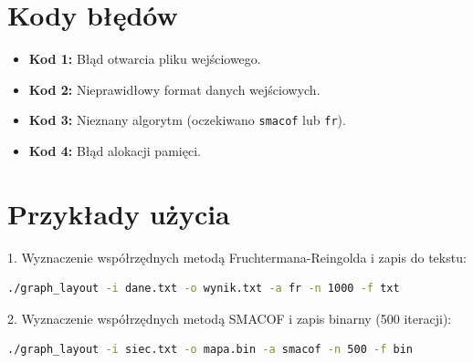 \documentclass[12pt,a4paper]{article}
\begin{document}
\section{Kody błędów}
\begin{itemize}
    \item \textbf{Kod 1:} Błąd otwarcia pliku wejściowego.
    \item \textbf{Kod 2:} Nieprawidłowy format danych wejściowych.
    \item \textbf{Kod 3:} Nieznany algorytm (oczekiwano \texttt{smacof} lub \texttt{fr}).
    \item \textbf{Kod 4:} Błąd alokacji pamięci.
\end{itemize}

\section{Przykłady użycia}

1. Wyznaczenie współrzędnych metodą Fruchtermana-Reingolda i zapis do tekstu:
\begin{lstlisting}[language=bash]
./graph_layout -i dane.txt -o wynik.txt -a fr -n 1000 -f txt
\end{lstlisting}

2. Wyznaczenie współrzędnych metodą SMACOF i zapis binarny (500 iteracji):
\begin{lstlisting}[language=bash]
./graph_layout -i siec.txt -o mapa.bin -a smacof -n 500 -f bin
\end{lstlisting}
\end{document}
